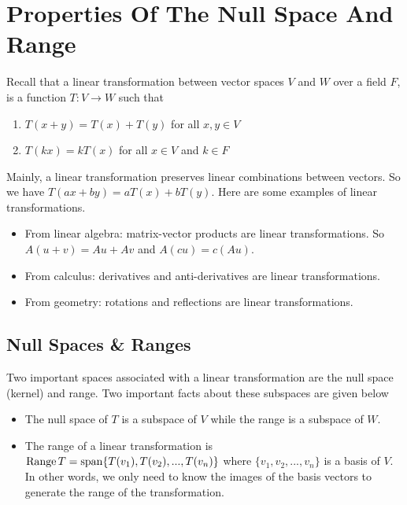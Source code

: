 \documentclass[main.tex]{subfiles}
\begin{document}
    \chapter{Properties Of The Null Space And Range}

    Recall that a linear transformation between vector spaces $V$ and $W$ over a field $F$, is a function $T: V\to W$ such that 
    \begin{enumerate}
        \item $T(x+y) = T(x) + T(y)$ for all $x,y\in V$
        \item $T(kx) = kT(x)$ for all $x\in V$ and $k\in F$
    \end{enumerate}
    Mainly, a linear transformation preserves linear combinations between vectors. So we have $T(ax+by) = aT(x) + bT(y)$. Here are some examples of linear transformations. 
    \begin{itemize}
        \item From linear algebra: matrix-vector products are linear transformations. So $A(u+v) = Au + Av$ and $A(cu) = c(Au)$. 

        \item From calculus: derivatives and anti-derivatives are linear transformations. 

        \item From geometry: rotations and reflections are linear transformations.
    \end{itemize}

    \section{Null Spaces \& Ranges}
    Two important spaces associated with a linear transformation are the null space (kernel) and range. Two important facts about these subspaces are given below 
    \begin{itemize}
        \item The null space of $T$ is a subspace of $V$ while the range is a subspace of $W$. 
        \item The range of a linear transformation is $\operatorname{Range} T = \operatorname{span} \{T(v_1), T(v_2), ..., T(v_n)\}$ where $\{v_1, v_2, ..., v_n\}$ is a basis of $V$. In other words, we only need to know the images of the basis vectors to generate the range of the transformation.
    \end{itemize}
\end{document}
